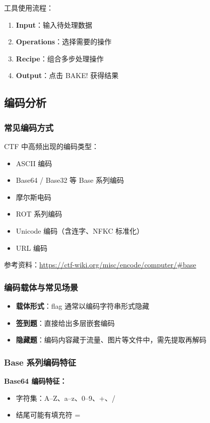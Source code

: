 工具使用流程：
\begin{enumerate}[leftmargin=*]
    \item \textbf{Input}：输入待处理数据
    \item \textbf{Operations}：选择需要的操作
    \item \textbf{Recipe}：组合多步处理操作
    \item \textbf{Output}：点击 BAKE! 获得结果
\end{enumerate}

\subsection{编码分析}
\subsubsection{常见编码方式}
CTF 中高频出现的编码类型：
\begin{itemize}[leftmargin=*]
    \item ASCII 编码
    \item Base64 / Base32 等 Base 系列编码
    \item 摩尔斯电码
    \item ROT 系列编码
    \item Unicode 编码（含连字、NFKC 标准化）
    \item URL 编码
\end{itemize}

参考资料：\url{https://ctf-wiki.org/misc/encode/computer/#base}

\subsubsection{编码载体与常见场景}
\begin{itemize}[leftmargin=*]
    \item \textbf{载体形式}：flag 通常以编码字符串形式隐藏
    \item \textbf{签到题}：直接给出多层嵌套编码
    \item \textbf{隐藏题}：编码内容藏于流量、图片等文件中，需先提取再解码
\end{itemize}

\subsubsection{Base 系列编码特征}
\textbf{Base64 编码特征：}
\begin{itemize}[leftmargin=*]
    \item 字符集：A–Z、a–z、0–9、+、/
    \item 结尾可能有填充符 =
\end{itemize}

